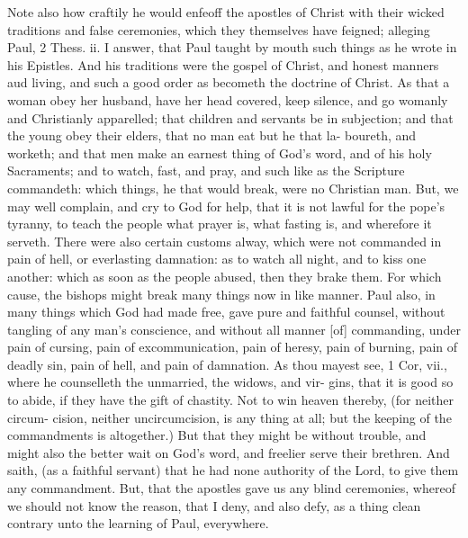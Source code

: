 \documentclass{custom}
\begin{document}
Note also how craftily he would enfeoff the apostles of 
Christ with their wicked traditions and false ceremonies, 
which they themselves have feigned; alleging Paul, 
2 Thess. ii. I answer, that Paul taught by mouth such 
things as he wrote in his Epistles. And his traditions 
were the gospel of Christ, and honest manners aud living, 
and such a good order as becometh the doctrine of Christ. 
As that a woman obey her husband, have her head covered, 
keep silence, and go womanly and Christianly apparelled; 
that children and servants be in subjection; and that the 
young obey their elders, that no man eat but he that la- 
boureth, and worketh; and that men make an earnest 
thing of God's word, and of his holy Sacraments; and 
to watch, fast, and pray, and such like as the Scripture 
commandeth: which things, he that would break, were 
no Christian man. But, we may well complain, and 
cry to God for help, that it is not lawful for the pope's 
tyranny, to teach the people what prayer is, what fasting 
is, and wherefore it serveth. There were also certain 
customs alway, which were not commanded in pain of 
hell, or everlasting damnation: as to watch all night, 
and to kiss one another: which as soon as the people 
abused, then they brake them. For which cause, the 
bishops might break many things now in like manner. 
Paul also, in many things which God had made free, gave 
pure and faithful counsel, without tangling of any man's 
conscience, and without all manner [of] commanding, under 
pain of cursing, pain of excommunication, pain of heresy, 
pain of burning, pain of deadly sin, pain of hell, and 
pain of damnation. As thou mayest see, 1 Cor, vii., 
where he counselleth the unmarried, the widows, and vir- 
gins, that it is good so to abide, if they have the gift of 
chastity. Not to win heaven thereby, (for neither circum- 
cision, neither uncircumcision, is any thing at all; but the 
keeping of the commandments is altogether.) But that 
they might be without trouble, and might also the better 
wait on God's word, and freelier serve their brethren. And 
saith, (as a faithful servant) that he had none authority of 
the Lord, to give them any commandment. But, that the 
apostles gave us any blind ceremonies, whereof we should 
not know the reason, that I deny, and also defy, as a 
thing clean contrary unto the learning of Paul, everywhere. 
\end{document}
